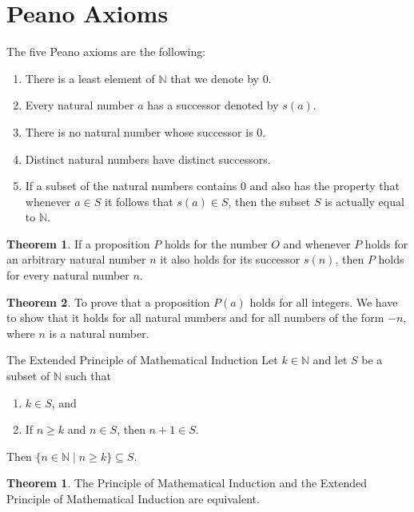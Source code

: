 \documentclass[letterpaper, 10pt]{article}
\theoremstyle{definition}
\newtheorem{thm}{Theorem}[section]
\newtheorem*{thm*}{Theorem}
\theoremstyle{definition}
\newcommand{\thistheoremname}{}
\newtheorem*{genericthm*}{\thistheoremname}
\newenvironment{namedthm*}[1]
	{\renewcommand{\thistheoremname}{#1}%
	\begin{genericthm*}}
	{\end{genericthm*}}
\newcommand{\set}[1]{\{#1\}}
\renewcommand{\ge}{\geqslant}
\begin{document}
\section{Peano Axioms}

The five Peano axioms are the following:
\begin{enumerate}[label=(\roman*)]
	\item There is a least element of $\mathbb{N}$ that we denote by $0$.
	\item Every natural number $a$ has a successor denoted by $s(a)$.
	\item There is no natural number whose successor is $0$.
	\item Distinct natural numbers have distinct successors.
	\item If a subset of the natural numbers contains $0$ and also has the
		property that whenever $a \in S$ it follows that $s(a) \in S$, then the
		subset $S$ is actually equal to $\mathbb{N}$.
\end{enumerate}

\begin{thm}
	If a proposition $P$ holds for the number $O$ and whenever $P$ holds for
	an arbitrary natural number $n$ it also holds for its successor
	$s(n)$, then $P$ holds for every natural number $n$.
\end{thm}

\begin{thm}
	To prove that a proposition $P(a)$ holds for all integers. We have to show
	that it holds for all natural numbers and for all numbers of the form $-n$,
	where $n$ is a natural number.
\end{thm}

\begin{namedthm*}{The Extended Principle of Mathematical
	Induction}\cite{fletcher}
	Let $k \in \mathbb{N}$ and let $S$ be a subset of $\mathbb{N}$ such that 
	\begin{enumerate}[label=\alph*)]
		\item $k \in S$, and 
		\item If $n \ge k$ and $n \in S$, then $n + 1 \in S$.
	\end{enumerate}
	Then $\set{n \in \mathbb{N} \mid n \ge k} \subseteq S$.
\end{namedthm*}

\begin{thm*}
	The Principle of Mathematical Induction and the Extended
	Principle of Mathematical Induction are equivalent.
\end{thm*}
\end{document}

